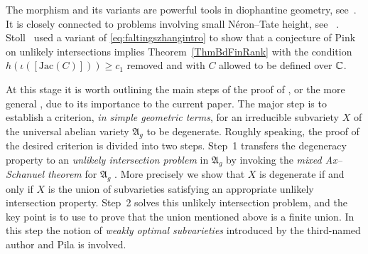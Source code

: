 The morphism and its variants are powerful tools in diophantine
geometry, see~\cite[Lemma~4.1]{Faltings:DAAV}. It is closely connected
to problems involving small N\'eron--Tate height,
see~\cite[Lemma~3.1]{ZhangEquidist}%
. Stoll~\cite{Stoll:Uniform} used a
variant of \eqref{eq:faltingszhangintro} to show that a conjecture of
Pink~\cite{Pink} on unlikely intersections implies
Theorem~\ref{ThmBdFinRank} with the condition
$h(\iota([\mathrm{Jac}(C)])) \ge c_1$ removed and with $C$ allowed to
be defined over ${\mathbb{C}}$.
 
At this stage it is worth outlining the main steps of the proof of \cite[Theorem~1.2']{GaoBettiRank}, or the more general \cite[Theorem~1.3]{GaoBettiRank}, due to its importance to the current paper. The major step is to establish a criterion, \textit{in simple geometric terms}, for an irreducible subvariety $X$ of the universal abelian variety $\mathfrak{A}_g$ to be degenerate. Roughly speaking, the proof of the desired criterion is divided into two steps. Step~1 transfers the degeneracy property to an \textit{unlikely intersection problem} in $\mathfrak{A}_g$ by invoking the \textit{mixed Ax--Schanuel theorem} for $\mathfrak{A}_g$ \cite[Theorem~1.1]{GaoMixedAS}. More precisely we show that $X$ is degenerate if and only if $X$ is the union of subvarieties satisfying an appropriate unlikely intersection property. Step~2 solves this unlikely intersection problem, and the key point is to use \cite[Theorem~1.4]{GaoMixedAS} to prove that the union mentioned above is a finite union. In this step the notion of \textit{weakly optimal subvarieties} introduced by the third-named author and Pila \cite{HabeggerPilaENS} is involved.


